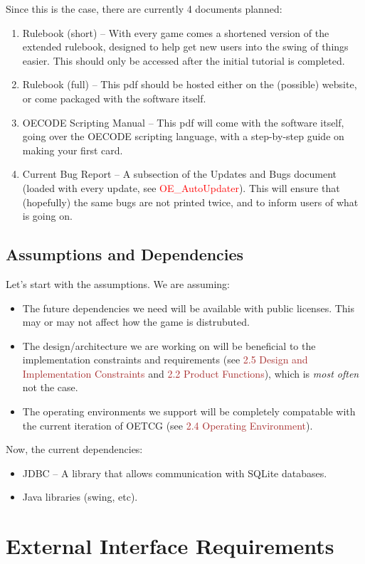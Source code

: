 \documentclass{scrreprt}
\begin{document}
Since this is the case, there are currently 4 documents planned:

\begin{enumerate}
	\item Rulebook (short) --  With every game comes a shortened version of the extended rulebook, designed to help get new users into the swing of things easier. This should only be accessed after the initial tutorial is completed.
	\item Rulebook (full) -- This pdf should be hosted either on the (possible) website, or come packaged with the software itself.
	\item OECODE Scripting Manual -- This pdf will come with the software itself, going over the OECODE scripting language, with a step-by-step guide on making your first card.
	\item Current Bug Report -- A subsection of the Updates and Bugs document (loaded with every update, see \textcolor{red}{OE_AutoUpdater}). This will ensure that (hopefully) the same bugs are not printed twice, and to inform users of what is going on.
\end{enumerate}
\section{Assumptions and Dependencies}
Let's start with the assumptions. We are assuming:
\begin{itemize}
	\item The future dependencies we need will be available with public licenses. This may or may not affect how the game is distrubuted.
	\item The design/architecture we are working on will be beneficial to the implementation constraints and requirements (see \textcolor{brown}{2.5 Design and Implementation Constraints} and \textcolor{brown}{2.2 Product Functions}), which is \textit{most often} not the case.
	\item The operating environments we support will be completely compatable with the current iteration of OETCG (see \textcolor{brown}{2.4 Operating Environment}).
\end{itemize}

Now, the current dependencies:
\begin{itemize}
	\item JDBC -- A library that allows communication with SQLite databases.
	\item Java libraries (swing, etc).
\end{itemize}
\chapter{External Interface Requirements}
\end{document}
